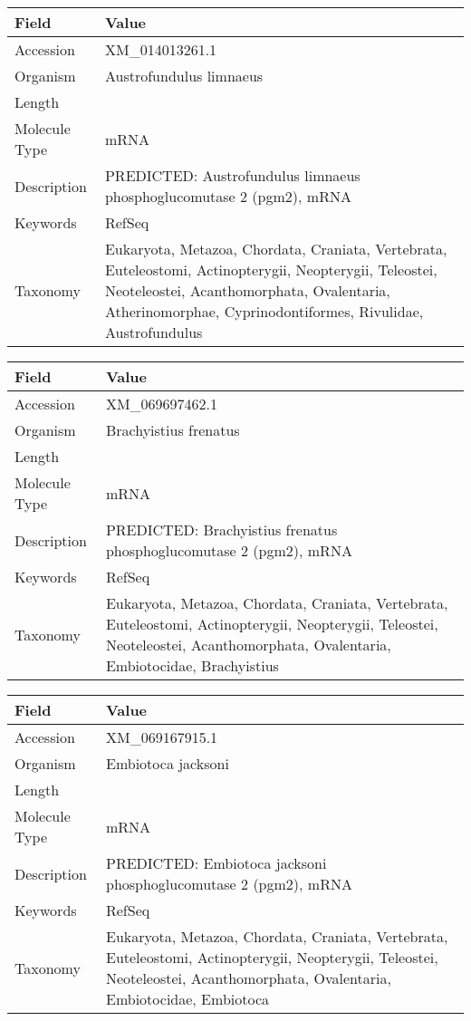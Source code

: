 \documentclass[10pt]{article}
\begin{document}
\vspace{1em}
{\footnotesize
\begin{longtable}{>{\raggedright\arraybackslash}p{4.5cm} >{\raggedright\arraybackslash}p{11.5cm}}
\textbf{Field} & \textbf{Value} \\
\hline
Accession & XM\_014013261.1 \\
Organism & Austrofundulus limnaeus \\
Length & 3022 \\
Molecule Type & mRNA \\
Description & PREDICTED: Austrofundulus limnaeus phosphoglucomutase 2 (pgm2), mRNA \\
Keywords & RefSeq \\
Taxonomy & Eukaryota, Metazoa, Chordata, Craniata, Vertebrata, Euteleostomi, Actinopterygii, Neopterygii, Teleostei, Neoteleostei, Acanthomorphata, Ovalentaria, Atherinomorphae, Cyprinodontiformes, Rivulidae, Austrofundulus \\
\end{longtable}
}

\vspace{1em}
{\footnotesize
\begin{longtable}{>{\raggedright\arraybackslash}p{4.5cm} >{\raggedright\arraybackslash}p{11.5cm}}
\textbf{Field} & \textbf{Value} \\
\hline
Accession & XM\_069697462.1 \\
Organism & Brachyistius frenatus \\
Length & 2981 \\
Molecule Type & mRNA \\
Description & PREDICTED: Brachyistius frenatus phosphoglucomutase 2 (pgm2), mRNA \\
Keywords & RefSeq \\
Taxonomy & Eukaryota, Metazoa, Chordata, Craniata, Vertebrata, Euteleostomi, Actinopterygii, Neopterygii, Teleostei, Neoteleostei, Acanthomorphata, Ovalentaria, Embiotocidae, Brachyistius \\
\end{longtable}
}

\vspace{1em}
{\footnotesize
\begin{longtable}{>{\raggedright\arraybackslash}p{4.5cm} >{\raggedright\arraybackslash}p{11.5cm}}
\textbf{Field} & \textbf{Value} \\
\hline
Accession & XM\_069167915.1 \\
Organism & Embiotoca jacksoni \\
Length & 2977 \\
Molecule Type & mRNA \\
Description & PREDICTED: Embiotoca jacksoni phosphoglucomutase 2 (pgm2), mRNA \\
Keywords & RefSeq \\
Taxonomy & Eukaryota, Metazoa, Chordata, Craniata, Vertebrata, Euteleostomi, Actinopterygii, Neopterygii, Teleostei, Neoteleostei, Acanthomorphata, Ovalentaria, Embiotocidae, Embiotoca \\
\end{longtable}
}
\end{document}
